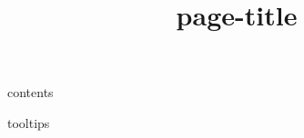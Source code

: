 \documentclass{article}
\title{{page-title}}
\date{}
\begin{document}
\maketitle

{contents}

{tooltips}
\end{document}
